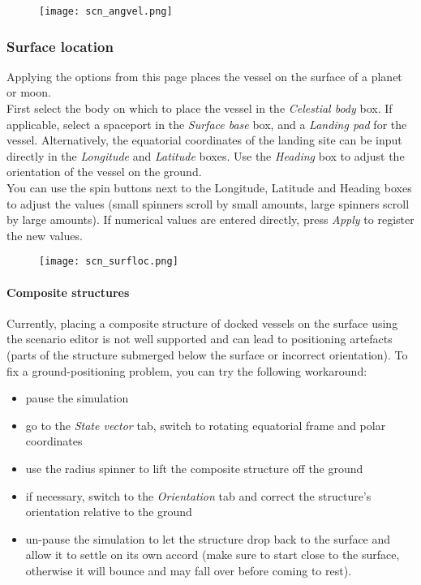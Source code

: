 \documentclass[Orbiter User Manual.tex]{subfiles}
\begin{document}
\begin{figure}[H]
	\centering
	\texttt{[image: scn\_angvel.png]}
\end{figure}

\subsubsection{Surface location}
\label{sssec:scneditor_surface}
Applying the options from this page places the vessel on the surface of a planet or moon.\\
First select the body on which to place the vessel in the \textit{Celestial body} box. If applicable, select a spaceport in the \textit{Surface base} box, and a \textit{Landing pad} for the vessel. Alternatively, the equatorial coordinates of the landing site can be input directly in the \textit{Longitude} and \textit{Latitude} boxes. Use the \textit{Heading} box to adjust the orientation of the vessel on the ground.\\
You can use the spin buttons next to the Longitude, Latitude and Heading boxes to adjust the values (small spinners scroll by small amounts, large spinners scroll by large amounts). If numerical values are entered directly, press \textit{Apply} to register the new values.

\begin{figure}[H]
	\centering
	\texttt{[image: scn\_surfloc.png]}
\end{figure}

\noindent
\paragraph{Composite structures}
Currently, placing a composite structure of docked vessels on the surface using the scenario editor is not well supported and can lead to positioning artefacts (parts of the structure submerged below the surface or incorrect orientation). To fix a ground-positioning problem, you can try the following workaround:

\begin{itemize}
\item pause the simulation
\item go to the \textit{State vector} tab, switch to rotating equatorial frame and polar coordinates
\item use the radius spinner to lift the composite structure off the ground
\item if necessary, switch to the \textit{Orientation} tab and correct the structure's orientation relative to the ground
\item un-pause the simulation to let the structure drop back to the surface and allow it to settle on its own accord (make sure to start close to the surface, otherwise it will bounce and may fall over before coming to rest).
\end{itemize}
\end{document}
